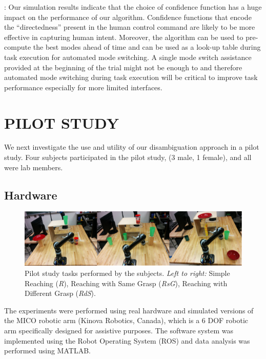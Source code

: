 \documentclass[conference]{IEEEtran}
\begin{document}
:  Our simulation results indicate that the choice of confidence function has a huge impact on the performance of our algorithm. Confidence functions that encode the ``directedness'' present in the human control command are likely to be more effective in capturing human intent.
 Moreover, the algorithm can be used to pre-compute the best modes ahead of time and can be used as a look-up table during task execution for automated mode switching. A single mode switch assistance provided at the beginning of the trial might not be enough to and therefore automated mode switching during task execution will be critical to improve task performance especially for more limited interfaces. 
 \section{PILOT STUDY} \label{EXP}
 We next investigate the use and utility of our disambiguation approach in a pilot study. Four subjects participated in the pilot study, (3 male, 1 female), and all were lab members.
 \subsection{Hardware}
 \begin{figure}[ht]
 	\centering
 	\includegraphics[width = 1\hsize]{./figures/TASKS.png}
 	\caption{Pilot study tasks performed by the subjects. \textit{Left to right:} Simple Reaching (\textit{R}), Reaching with Same Grasp (\textit{RsG}), Reaching with Different Grasp (\textit{RdS}).}
 	\label{TASKS}
 \end{figure}
 The experiments were performed using real hardware and simulated versions of the MICO robotic arm (Kinova Robotics, Canada), which is a 6 DOF robotic arm specifically designed for assistive purposes. The software system was implemented using the Robot Operating System (ROS) and data analysis was performed using MATLAB. 
 
\end{document}
